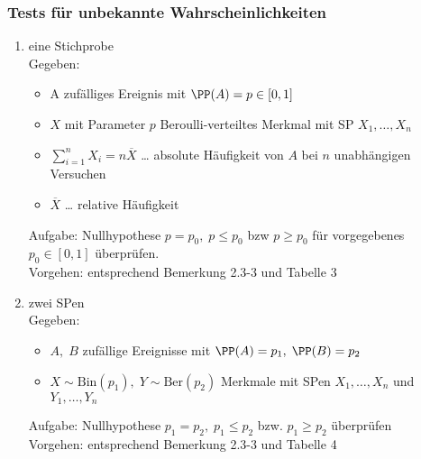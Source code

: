 \subsubsection{Tests für unbekannte Wahrscheinlichkeiten}
\begin{enumerate}[label=(\Alph*)]
\item eine Stichprobe\\
Gegeben:
\begin{itemize}
\item A zufälliges Ereignis mit $\PP(A)=p\in[0,1]$
\item $X$ mit Parameter $p$ Beroulli-verteiltes Merkmal mit SP $X_1, \ldots, X_n$
\item $\sum_{i=1}^n X_i = n \overline{X}$ … absolute Häufigkeit von $A$ bei $n$ unabhängigen Versuchen
\item $\overline{X}$ … relative Häufigkeit
\end{itemize}
Aufgabe: Nullhypothese $p=p_0, \; p \leq p_0$ bzw $p \geq p_0$ für vorgegebenes $p_0\in [0,1]$ überprüfen.\\
Vorgehen: entsprechend Bemerkung 2.3-3 und Tabelle 3
\item zwei SPen\\
Gegeben:
\begin{itemize}
\item $A,\;B$ zufällige Ereignisse mit $\PP(A)=p_1, \; \PP(B)=p_2$
\item $X\sim \mathrm{Bin}(p_1), \; Y\sim \mathrm{Ber}(p_2)$ Merkmale mit SPen $X_1, \ldots, X_n$ und $Y_1, \ldots , Y_n$
\end{itemize}
Aufgabe: Nullhypothese $p_1=p_2,\; p_1 \leq p_2$ bzw. $p_1 \geq p_2$ überprüfen\\
Vorgehen: entsprechend Bemerkung 2.3-3 und Tabelle 4
\end{enumerate}

